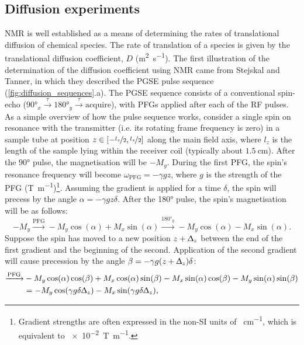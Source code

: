 \subsection{Diffusion experiments}
\label{subsec:diffusion_experiments}
\ac{NMR} is well established as a means of determining the rates of
translational diffusion of chemical species\cite{Johnson1999,Morris2009b}.
The rate of translation of a species is given by the translational
diffusion coefficient, $D$ (\unit{\meter\squared\per\second})\cite[Chapter
19]{Atkins2014}.
The first illustration of the determination of the diffusion coefficient using
\ac{NMR} came from Stejskal and Tanner, in which they described the \ac{PGSE}
pulse sequence\cite{Stejskal1965} (\cref{fig:diffusion_sequences}.a).
The \ac{PGSE} sequence consists of a conventional spin-echo ($\ang{90}_x
\xrightarrow{\tau} \ang{180}_y \xrightarrow{\tau} \text{acquire}$), with
\acp{PFG} applied after each of the \ac{RF} pulses.
As a simple overview of how the pulse sequence works, consider a single spin on
resonance with the transmitter (i.e. its rotating frame frequency is zero) in a
sample tube at position $z \in [-\nicefrac{l_z}{2}, \nicefrac{l_z}{2}]$ along
the main field axis, where $l_z$ is the length of the sample lying within the
receiver coil (typically about $\qty{1.5}{\centi\meter}$).
After the \ang{90} pulse, the magnetisation will be $-M_y$.
During the first \ac{PFG}, the spin's resonance frequency will become
$\omega_{\text{PFG}} = -\gamma g z$, where $g$ is the strength of the \ac{PFG}
(\unit{\tesla\per\meter})\footnote{
    Gradient strengths are often expressed in the non-\ac{SI} units of
    \unit{\gauss\per\centi\meter}, which is equivalent to
    \qty[print-unity-mantissa = false]{e-2}{\tesla\per\meter}.
}.
Assuming the gradient is applied for a time $\delta$, the spin will
precess by the angle $\alpha = -\gamma g z \delta$. After the \ang{180}
pulse, the spin's magnetisation will be as follows:
\[
    -M_y
    \xrightarrow{\text{PFG}} -M_y \cos(\alpha) + M_x \sin(\alpha)
    \xrightarrow{\ang{180}_y} -M_y \cos(\alpha) - M_x \sin(\alpha).
\]
Suppose the spin has moved to a new position $z + \Updelta_z$
between the end of the first gradient and the beginning of the second.
Application of the second gradient will cause precession by the angle
$\beta = -\gamma g (z + \Updelta_z) \delta$:
\begin{equation*}
   \begin{split}
        \xrightarrow{\text{PFG}}
            &-M_y \cos(\alpha)\cos(\beta) +
            M_x \cos(\alpha)\sin(\beta) -
            M_x \sin(\alpha)\cos(\beta) -
            M_y \sin(\alpha)\sin(\beta)\\
        &= -M_y \cos(\gamma g \delta \Updelta_z) -
           M_x \sin(\gamma g \delta \Updelta_z),
   \end{split}
\end{equation*}

